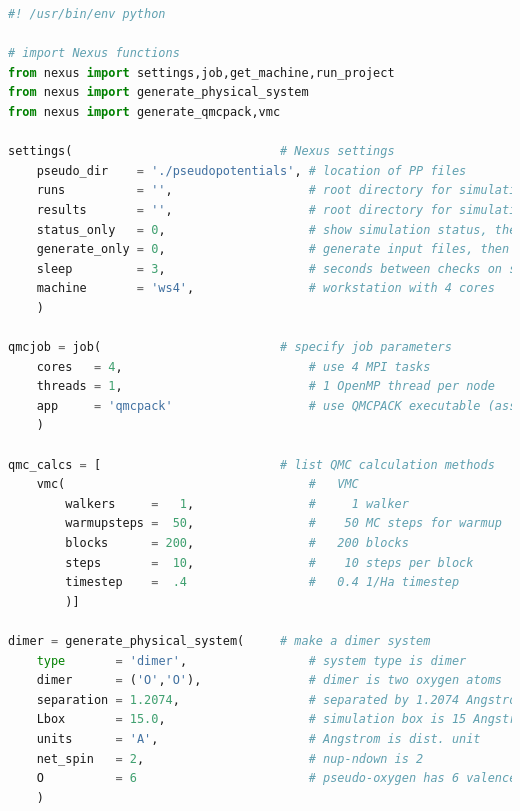 

\ifws
\begin{lstlisting}[language=Python]
#! /usr/bin/env python

# import Nexus functions
from nexus import settings,job,get_machine,run_project 
from nexus import generate_physical_system
from nexus import generate_qmcpack,vmc

settings(                             # Nexus settings
    pseudo_dir    = './pseudopotentials', # location of PP files
    runs          = '',                   # root directory for simulations
    results       = '',                   # root directory for simulation results
    status_only   = 0,                    # show simulation status, then exit
    generate_only = 0,                    # generate input files, then exit
    sleep         = 3,                    # seconds between checks on sim. progress
    machine       = 'ws4',                # workstation with 4 cores
    ) 

qmcjob = job(                         # specify job parameters
    cores   = 4,                          # use 4 MPI tasks
    threads = 1,                          # 1 OpenMP thread per node
    app     = 'qmcpack'                   # use QMCPACK executable (assumed in PATH)
    )

qmc_calcs = [                         # list QMC calculation methods
    vmc(                                  #   VMC
        walkers     =   1,                #     1 walker
        warmupsteps =  50,                #    50 MC steps for warmup
        blocks      = 200,                #   200 blocks
        steps       =  10,                #    10 steps per block
        timestep    =  .4                 #   0.4 1/Ha timestep
        )]

dimer = generate_physical_system(     # make a dimer system
    type       = 'dimer',                 # system type is dimer
    dimer      = ('O','O'),               # dimer is two oxygen atoms
    separation = 1.2074,                  # separated by 1.2074 Angstrom
    Lbox       = 15.0,                    # simulation box is 15 Angstrom 
    units      = 'A',                     # Angstrom is dist. unit
    net_spin   = 2,                       # nup-ndown is 2
    O          = 6                        # pseudo-oxygen has 6 valence el.
    )


\end{lstlisting}
